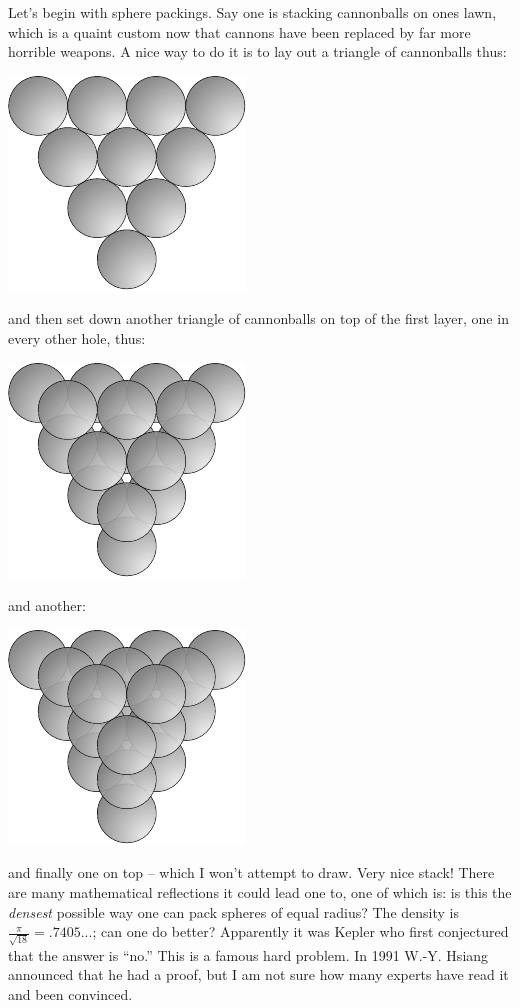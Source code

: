 Let's begin with sphere packings. Say one is stacking cannonballs on ones lawn, which is a quaint custom now that cannons have been replaced by far more horrible weapons. A nice way to do it is to lay out a triangle of cannonballs thus:
\begin{center}
\includegraphics[]{figures/wk20_fig1.pdf}
\end{center}
and then set down another triangle of cannonballs on top of the first layer, one in every other hole, thus:
\begin{center}
\includegraphics[]{figures/wk20_fig2.pdf}
\end{center}
%
and another:
\begin{center}
\includegraphics[]{figures/wk20_fig3.pdf}
\end{center}
%
and finally one on top -- which I won't attempt to draw. %
Very nice stack! There are many mathematical reflections it could lead one to, one of which is: is this the \emph{densest} possible way one can pack spheres of equal radius? The density is $\frac{\pi}{\sqrt{18}} = .7405...$; can one do better? Apparently it was Kepler who first conjectured that the answer is ``no.'' This is a famous hard problem. In 1991 W.-Y. Hsiang announced that he had a proof, but I am not sure how many experts have read it and been convinced.

